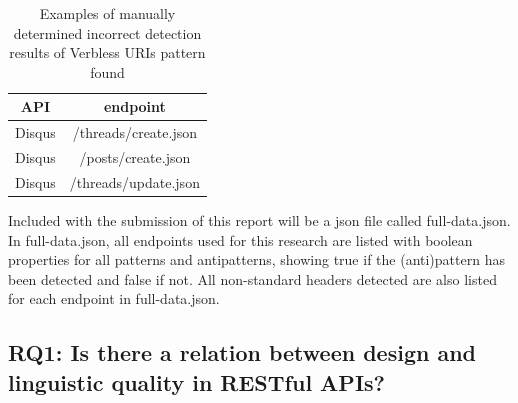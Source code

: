 \begin{table}[]
    \centering
    \begin{tabular}{|c|c|} \hline
        API & endpoint \\ \hline
        Disqus & /threads/create.json \\ \hline
        Disqus & /posts/create.json \\ \hline
        Disqus & /threads/update.json \\ \hline
    \end{tabular}
    \caption{Examples of manually determined incorrect detection results of Verbless URIs pattern found}
    \label{tab:Examples of manually determined incorrect detection results of Verbless URIs pattern found}
\end{table}

Included with the submission of this report will be a json file called full-data.json. In full-data.json, all endpoints used for this research are listed with boolean properties for all patterns and antipatterns, showing true if the (anti)pattern has been detected and false if not. All non-standard headers detected are also listed for each endpoint in full-data.json.

\clearpage

\subsection{RQ1: Is there a relation between design and linguistic quality in RESTful APIs?} \label{overallstats}

